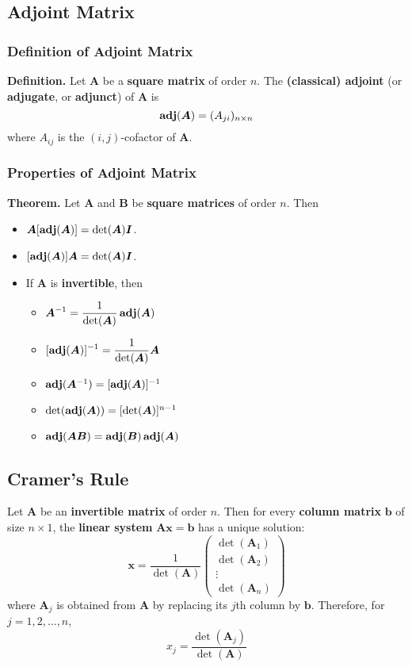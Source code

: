 \documentclass[../ma2001_notes.tex]{subfiles}
\begin{document}
\subsection{Adjoint Matrix}
\subsubsection{Definition of Adjoint Matrix}
\textbf{Definition.} Let \(\bm{A}\) be a \textbf{square matrix} of order \(n\). The \textbf{(classical) adjoint} (or \textbf{adjugate}, or \textbf{adjunct}) of \(\bm{A}\) is
\[\operatorname{\mathbf{adj}}(\bm{A})=(A_{ji})_{n\times n}\]
where \(A_{ij}\) is the \((i,j)\)-cofactor of \(\bm{A}\).

\subsubsection{Properties of Adjoint Matrix}
\textbf{Theorem.} Let \(\bm{A}\) and \(\bm{B}\) be \textbf{square matrices} of order \(n\). Then
\begin{itemize}
	\item\(\bm{A}[\operatorname{\mathbf{adj}}(\bm{A})]=\det(\bm{A})\bm{I}\).
	\item\([\operatorname{\mathbf{adj}}(\bm{A})]\bm{A}=\det(\bm{A})\bm{I}\).
	\item If \(\bm{A}\) is \textbf{invertible}, then
	\begin{itemize}
		\item\(\displaystyle\bm{A}^{-1}=\frac{1}{\det(\bm{A})}\operatorname{\mathbf{adj}}(\bm{A})\)
		\item\(\displaystyle[\operatorname{\mathbf{adj}}(\bm{A})]^{-1}=\frac{1}{\det(\bm{A})}\bm{A}\)
		\item\(\operatorname{\mathbf{adj}}(\bm{A}^{-1})=[\operatorname{\mathbf{adj}}(\bm{A})]^{-1}\)
		\item\(\det(\operatorname{\mathbf{adj}}(\bm{A}))=[\det(\bm{A})]^{n-1}\)
		\item\(\operatorname{\mathbf{adj}}(\bm{AB})=\operatorname{\mathbf{adj}}(\bm{B})\operatorname{\mathbf{adj}}(\bm{A})\)
	\end{itemize}
\end{itemize}

\subsection{Cramer's Rule}
Let \(\bm{A}\) be an \textbf{invertible matrix} of order \(n\). Then for every \textbf{column matrix} \(\bm{b}\) of size \(n\times1\), the \textbf{linear system} \(\bm{Ax}=\bm{b}\) has a unique solution:
\[\bm{x}=\frac{1}{\det(\bm{A})}\begin{pmatrix}
	\det(\bm{A}_1) \\ \det(\bm{A}_2) \\ \vdots \\ \det(\bm{A}_n)
\end{pmatrix}\]
where \(\bm{A}_j\) is obtained from \(\bm{A}\) by replacing its \(j\)th column by \(\bm{b}\). Therefore, for \(j=1,2,\ldots,n\),
\[x_j=\frac{\det(\bm{A}_j)}{\det(\bm{A})}\]
\end{document}
